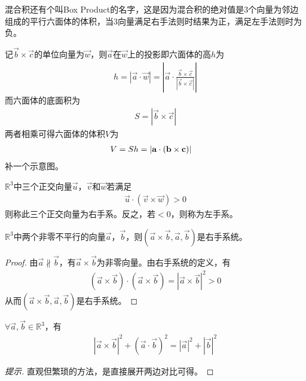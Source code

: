 \begin{example}[混合积的几何意义]
  混合积还有个叫Box Product的名字，这是因为混合积的绝对值是3个向量为邻边组成的平行六面体的体积，当3向量满足右手法则时结果为正，满足左手法则时为负。

  记$\vec b\times \vec c$的单位向量为$\vec w$，则$\vec a$在$\vec w$上的投影即六面体的高$h$为
  \begin{align*}
    h = |\vec a \cdot \vec w| =
    \left|\vec a\cdot \frac{\vec b\times \vec c}{|\vec b\times\vec c|} \right|
  \end{align*}
  而六面体的底面积为
  \begin{align*}
    S = |\vec b\times\vec c|
  \end{align*}
  两者相乘可得六面体的体积$V$为
  \begin{align*}
    V=Sh =|\vec a\cdot(\vec b\times \vec c)| &\qedhere
  \end{align*}
  \color{red}补一个示意图。
\end{example}

\begin{definition}[右手系]
  $\mathbb{R}^3$中三个正交向量$\vec u$，$\vec v$和$\vec w$若满足
  \begin{align*}
    \vec u \cdot (\vec v\times \vec w) > 0
  \end{align*}
  则称此三个正交向量为右手系。反之，若$<0$，则称为左手系。
\end{definition}

\begin{lemma}
  $\mathbb{R}^3$中两个非零不平行的向量$\vec a$，$\vec b$，则$(\vec a\times \vec b, \vec a, \vec b)$是右手系统。
\end{lemma}
\begin{proof}
  由$\vec a\not\parallel\vec b$，有$\vec a \times \vec b$为非零向量。由右手系统的定义，有
  \begin{align*}
    (\vec a\times \vec b) \cdot (\vec a\times \vec b) = \left| \vec a\times \vec b \right|^2 > 0
  \end{align*}
  从而$(\vec a\times \vec b, \vec a, \vec b)$是右手系统。
\end{proof}

\begin{lemma}\label{lem:c-prod2+dot-prod2=a2+b2}
  $\forall \vec a, \vec b\in\mathbb{R}^3$，有
  \begin{align*}
    \left|\vec a\times \vec b\right|^2 + (\vec a\cdot \vec b)^2 =
    \left|\vec a\right|^2 + \left|\vec b\right|^2
  \end{align*}
\end{lemma}
\begin{proof}[提示]
  直观但繁琐的方法，是直接展开两边对比可得。
\end{proof}

